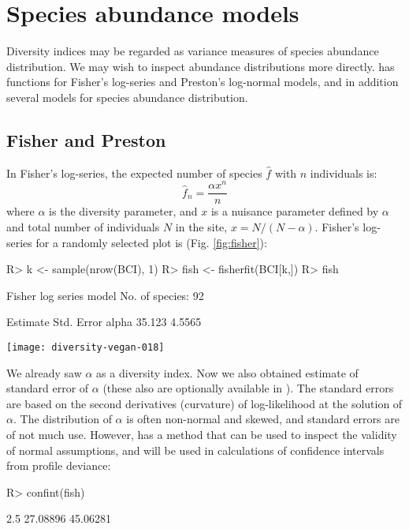 \documentclass[article,nojss]{jss}
\begin{document}
\section{Species abundance models}

Diversity indices may be regarded as variance measures of species
abundance distribution.  We may wish to inspect abundance
distributions more directly.   has functions for
Fisher's log-series and Preston's log-normal models, and in addition
several models for species abundance distribution.

\subsection{Fisher and Preston}

In Fisher's log-series, the expected number of species $\hat f$ with $n$
individuals is:
\begin{equation}
\hat f_n = \frac{\alpha x^n}{n}
\end{equation}
where $\alpha$ is the diversity parameter, and $x$ is a nuisance
parameter defined by $\alpha$ and total number
of individuals $N$ in the site, $x = N/(N-\alpha)$.  Fisher's
log-series for a randomly selected plot is (Fig. \ref{fig:fisher}):
\begin{Schunk}
\begin{Sinput}
R> k <- sample(nrow(BCI), 1)
R> fish <- fisherfit(BCI[k,])
R> fish
\end{Sinput}
\begin{Soutput}
Fisher log series model
No. of species: 92 

      Estimate Std. Error
alpha   35.123     4.5565
\end{Soutput}
\end{Schunk}
\begin{SCfigure}
\texttt{[image: diversity-vegan-018]}
\caption{Fisher's log-series fitted to one randomly selected site
  (34).}
\label{fig:fisher}
\end{SCfigure}
We already saw $\alpha$ as a diversity index.  Now we also obtained
estimate of standard error of $\alpha$ (these also are optionally
available in ).  The standard errors are based on
the second derivatives (curvature) of log-likelihood at the solution
of $\alpha$.  The distribution of $\alpha$ is often non-normal
and skewed, and standard errors are of not much use.  However,
 has a  method that can be used to
inspect the validity of normal assumptions, and will be used in
calculations of confidence intervals from profile deviance:
\begin{Schunk}
\begin{Sinput}
R> confint(fish)
\end{Sinput}
\begin{Soutput}
   2.5 %   97.5 % 
27.08896 45.06281 
\end{Soutput}
\end{Schunk}
\end{document}

